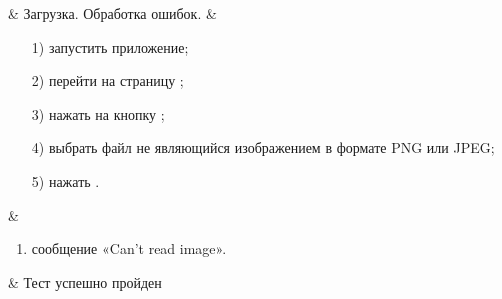 \begin{longtable}
	 & Загрузка. Обработка ошибок. & 
   			\begin{enumerate}
				\item[1)] запустить приложение;
				\item[2)] перейти на страницу \imrPage{};
				\item[3)] нажать на кнопку \selectButton{};
				\item[4)] выбрать файл не являющийся изображением в формате PNG или JPEG;
				\item[5)] нажать \submitButton{}.
			\end{enumerate}
   			& 
   			\begin{enumerate}
   				\item сообщение «Can't read image».
   			\end{enumerate}
   			& Тест успешно пройден \\ 	
   \hline
\end{longtable}

